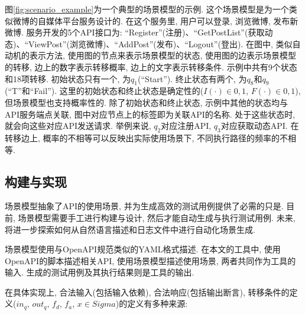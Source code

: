             图\ref{fig:scenario_example}为一个典型的场景模型的示例. 这个场景模型是为一个类似微博的自媒体平台服务设计的. 在这个服务里, 用户可以登录, 浏览微博, 发布新微博. 服务开发的5个API接口为: “Register”(注册)、“GetPostList”(获取动态)、“ViewPost”(浏览微博)、“AddPost”(发布)、“Logout”(登出). 在图中, 类似自动机的表示方法, 使用图的节点来表示场景模型的状态, 使用图的边表示场景模型的转移, 边上的数字表示转移概率, 边上的文字表示转移条件. 示例中共有9个状态和18项转移. 初始状态只有一个, 为$q_1$(“Start”). 终止状态有两个, 为$q_8$和$q_9$(“T”和“Fail”). 这里的初始状态和终止状态是确定性的($I(\cdot) \in {0,1}$, $F(\cdot) \in {0,1}$), 但场景模型也支持概率性的. 除了初始状态和终止状态, 示例中其他的状态均与API服务端点关联, 图中对应节点上的标签即为关联API的名称. 处于这些状态时, 就会向这些对应API发送请求. 举例来说, $q_2$对应注册API, $q_3$对应获取动态API. 在转移边上, 概率的不相等可以反映出实际使用场景下, 不同执行路径的频率的不相等.
        
        \subsection{构建与实现}
            场景模型抽象了API的使用场景, 并为生成高效的测试用例提供了必需的只是. 目前, 场景模型需要手工进行构建与设计, 然后才能自动生成与执行测试用例. 未来, 将进一步探索如何从自然语言描述和日志文件中进行自动化场景生成.
            
            场景模型使用与OpenAPI规范类似的YAML格式描述. 在本文的工具中, 使用OpenAPI的脚本描述相关API, 使用场景模型描述使用场景, 两者共同作为工具的输入. 生成的测试用例及其执行结果则是工具的输出.
            
            在具体实现上, 合法输入(包括输入依赖), 合法响应(包括输出断言), 转移条件的定义($in_q$, $out_q$, $f_d$, $f_a$, $x \in Sigma$)的定义有多种来源:
            
